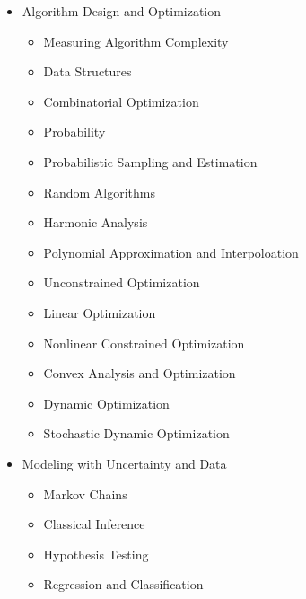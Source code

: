 \documentclass{article}
\begin{document}
\begin{addmargin}{2ex}
\begin{itemize}[labelindent=2ex, parsep=0ex, partopsep=0ex, topsep=-.7ex]
\begin{multicols}{2}
\begin{itemize}
          \item Contraction Mappings
          \item Daniell-Lebesgue Integration
          \item Calculus on Manifolds
          \item Complex Analysis
          \item Spectral Calculus
          \item Iterative Methods for Linear Systems
       \end{itemize}
      \end{multicols}
     \item Algorithm Design and Optimization
      \begin{multicols}{2}
        \begin{itemize}
          \item Measuring Algorithm Complexity
          \item Data Structures
          \item Combinatorial Optimization
          \item Probability
          \item Probabilistic Sampling and Estimation
          \item Random Algorithms
          \item Harmonic Analysis
          \item Polynomial Approximation and Interpoloation
          \item Unconstrained Optimization
          \item Linear Optimization
          \item Nonlinear Constrained Optimization
          \item Convex Analysis and Optimization
          \item Dynamic Optimization
          \item Stochastic Dynamic Optimization
       \end{itemize}
      \end{multicols}
    \item Modeling with Uncertainty and Data
      \begin{multicols}{2}
        \begin{itemize}
          \item Markov Chains
          \item Classical Inference
          \item Hypothesis Testing
          \item Regression and Classification

\end{itemize}
\end{multicols}
\end{itemize}
\end{addmargin}
\end{document}
